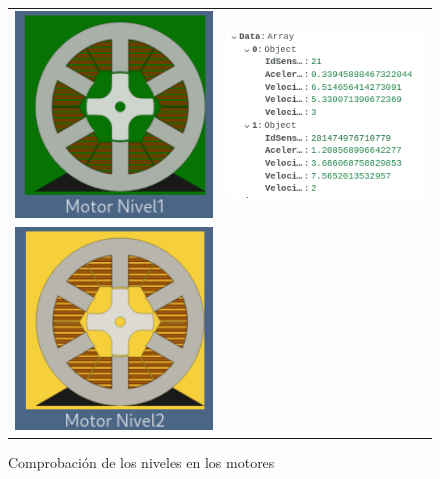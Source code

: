 \documentclass[12pt]{article}
\begin{document}
\begin{refsegment}
    
    
    
    
    
    \begin{figure}[H]
        \centering
        \caption{Comprobación de los niveles en los motores}
        \begin{tabular}{m{6cm}m{6cm}}
            \includegraphics[width=6cm]{comprobacion_resultados/finales/n1.png}&
            \includegraphics[width=6cm]{comprobacion_resultados/finales/n1mongo.png}\\
            \includegraphics[width=6cm]{comprobacion_resultados/finales/n2.png}&

\end{tabular}
\end{figure}
\end{refsegment}
\end{document}
